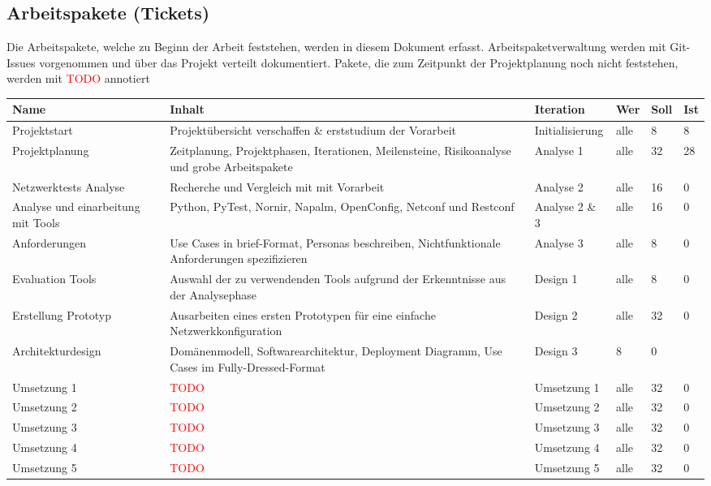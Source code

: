 \documentclass[
	ngerman,
	toc=listof, %
	toc=bibliography, %
	footnotes=multiple, %
	parskip=half, %
	numbers=noendperiod %
]{scrartcl}
\begin{document}
	\subsection{Arbeitspakete (Tickets) }
	Die Arbeitspakete, welche zu Beginn der Arbeit feststehen, werden in diesem Dokument erfasst.
	Arbeitspaketverwaltung werden mit Git-Issues vorgenommen und über das Projekt verteilt dokumentiert.
	Pakete, die zum Zeitpunkt der Projektplanung noch nicht feststehen, werden mit \textcolor{red}{TODO} annotiert	
	\begin{landscape}
			\begin{table}[!h]
				\begin{tabularx}{\linewidth}{lXllll}
					\toprule
					Name & Inhalt & Iteration & Wer & Soll & Ist\\
					\midrule
					Projektstart & Projektübersicht verschaffen \& erststudium der Vorarbeit & Initialisierung & alle & 8 & 8 \\
					\midrule
					Projektplanung & Zeitplanung, Projektphasen, Iterationen, Meilensteine, Risikoanalyse und grobe Arbeitspakete & Analyse 1 & alle & 32 & 28 \\
					Netzwerktests Analyse & Recherche und Vergleich mit mit Vorarbeit & Analyse 2 & alle & 16 & 0 \\
					Analyse und einarbeitung mit Tools & Python, PyTest, Nornir, Napalm, OpenConfig, Netconf und Restconf & Analyse 2 \& 3 & alle & 16 & 0 \\
					Anforderungen & Use Cases in brief-Format, Personas beschreiben, Nichtfunktionale Anforderungen spezifizieren & Analyse 3 & alle & 8 & 0 \\
					\midrule
					Evaluation Tools & Auswahl der zu verwendenden Tools aufgrund der Erkenntnisse aus der Analysephase & Design 1 & alle & 8 & 0 \\
					Erstellung Prototyp & Ausarbeiten eines ersten Prototypen für eine einfache Netzwerkkonfiguration & Design 2 & alle & 32 & 0 \\
					Architekturdesign & Domänenmodell, Softwarearchitektur, Deployment Diagramm, Use Cases im Fully-Dressed-Format & Design 3 & 8 & 0 \\
					\midrule
					Umsetzung 1 & \textcolor{red}{TODO} & Umsetzung 1 & alle & 32 & 0 \\
					Umsetzung 2 & \textcolor{red}{TODO} & Umsetzung 2 & alle & 32 & 0 \\
					Umsetzung 3 & \textcolor{red}{TODO} & Umsetzung 3 & alle & 32 & 0 \\
					Umsetzung 4 & \textcolor{red}{TODO} & Umsetzung 4 & alle & 32 & 0 \\
					Umsetzung 5 & \textcolor{red}{TODO} & Umsetzung 5 & alle & 32 & 0 \\
	

\end{tabularx}
\end{table}
\end{landscape}
\end{document}

